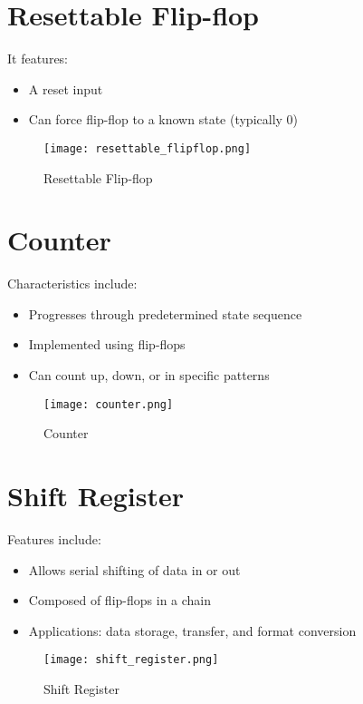 \documentclass[12pt]{report}
\begin{document}
\section{Resettable Flip-flop}
 It features:
\begin{itemize}
    \item A reset input
    \item Can force flip-flop to a known state (typically 0)
\end{itemize}
\begin{figure}[H]
    \centering
    \texttt{[image: resettable\_flipflop.png]}
    \caption{Resettable Flip-flop}
\end{figure}

\section{Counter}
 Characteristics include:
\begin{itemize}
    \item Progresses through predetermined state sequence
    \item Implemented using flip-flops
    \item Can count up, down, or in specific patterns
\end{itemize}
\begin{figure}[H]
    \centering
    \texttt{[image: counter.png]}
    \caption{Counter}
\end{figure}

\section{Shift Register}
 Features include:
\begin{itemize}
    \item Allows serial shifting of data in or out
    \item Composed of flip-flops in a chain
    \item Applications: data storage, transfer, and format conversion
\end{itemize}
\begin{figure}[H]
    \centering
    \texttt{[image: shift\_register.png]}
    \caption{Shift Register}
\end{figure}
\end{document}

